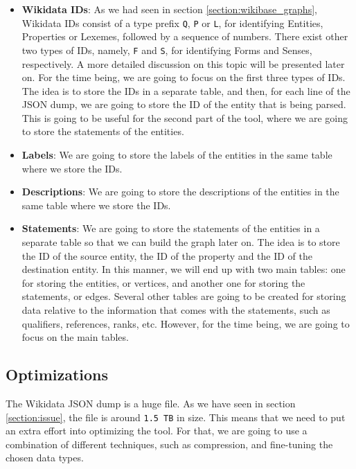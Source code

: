 \begin{itemize}
    \itemsep0.5em
    \item \textbf{Wikidata IDs}: As we had seen in section \ref{section:wikibase_graphs}, Wikidata IDs consist of a type prefix \texttt{Q}, \texttt{P} or \texttt{L}, for identifying Entities, Properties or Lexemes, followed by a sequence of numbers. There exist other two types of IDs, namely, \texttt{F} and \texttt{S}, for identifying Forms and Senses, respectively. A more detailed discussion on this topic will be presented later on. For the time being, we are going to focus on the first three types of IDs. The idea is to store the IDs in a separate table, and then, for each line of the JSON dump, we are going to store the ID of the entity that is being parsed. This is going to be useful for the second part of the tool, where we are going to store the statements of the entities.
    \item \textbf{Labels}: We are going to store the labels of the entities in the same table where we store the IDs.
    \item \textbf{Descriptions}: We are going to store the descriptions of the entities in the same table where we store the IDs.
    \item \textbf{Statements}: We are going to store the statements of the entities in a separate table so that we can build the graph later on. The idea is to store the ID of the source entity, the ID of the property and the ID of the destination entity. In this manner, we will end up with two main tables: one for storing the entities, or vertices, and another one for storing the statements, or edges. Several other tables are going to be created for storing data relative to the information that comes with the statements, such as qualifiers, references, ranks, etc. However, for the time being, we are going to focus on the main tables.
\end{itemize}

\subsection{Optimizations}

The Wikidata JSON dump is a huge file. As we have seen in section \ref{section:issue}, the file is around \texttt{1.5 TB} in size. This means that we need to put an extra effort into optimizing the tool. For that, we are going to use a combination of different techniques, such as compression, and fine-tuning the chosen data types.

